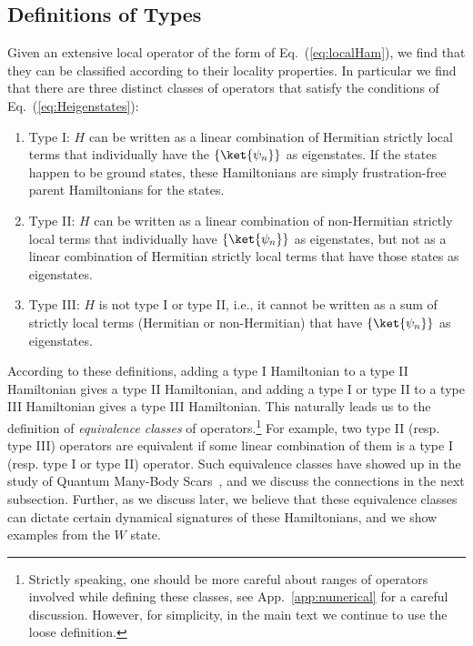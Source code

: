 \documentclass[prx,letterpaper,aps,superscriptaddress,floatfix,twocolumn,nofootinbib]{revtex4-2}
\theoremstyle{definition}
\begin{document}
\subsection{Definitions of Types}\label{subsec:classes}
%
Given an extensive local operator of the form of Eq.~(\ref{eq:localHam}), we find that they can be classified according to their locality properties. 
%
In particular we find that there are three distinct classes of operators that satisfy the conditions of Eq.~(\ref{eq:Heigenstates}):
%
\begin{enumerate}
    \item Type I: $H$ can be written as a linear combination of Hermitian strictly local terms that individually have the $\{\ket{\psi_{n}}\}$ as eigenstates.
    If the states happen to be ground states, these Hamiltonians are simply frustration-free parent Hamiltonians for the states.
    \item Type II: $H$ can be written as a linear combination of non-Hermitian strictly local terms that individually have $\{\ket{\psi_{n}}\}$ as eigenstates, but not as a linear combination of Hermitian strictly local terms that have those states as eigenstates.
    \item Type III: $H$ is not type I or type II, i.e., it cannot be written as a sum of strictly local terms (Hermitian or non-Hermitian) that have $\{\ket{\psi_{n}}\}$ as eigenstates. 
\end{enumerate}
%
According to these definitions, adding a type I Hamiltonian to a type II Hamiltonian gives a type II Hamiltonian, and adding a type I or type II to a type III Hamiltonian gives a type III Hamiltonian.
%
This naturally leads us to the definition of \textit{equivalence classes} of operators.\footnote{Strictly speaking, one should be more careful about ranges of operators involved while defining these classes, see App.~\ref{app:numerical} for a careful discussion.
However, for simplicity, in the main text we continue to use the loose definition.}
%
For example, two type II (resp. type III) operators are equivalent if some linear combination of them is a type I (resp. type I or type II) operator.
%
Such equivalence classes have showed up in the study of Quantum Many-Body Scars~\cite{moudgalya2023exhaustive}, and we discuss the connections in the next subsection.
%
Further, as we discuss later, we believe that these equivalence classes can dictate certain dynamical signatures of these Hamiltonians, and we show examples from the $W$ state. 
%
\end{document}

